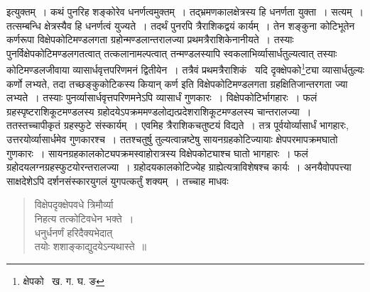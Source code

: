 \documentclass[11pt, openany]{book}
\begin{document}
\noindent इत्युक्तम्~। कथं पुनरिह शङ्कोरेव धनर्णत्वमुक्तम्~। तद्भ्रमणकालक्षेत्रस्य हि धनर्णता युक्ता~। सत्यम्~। तत्सम्बन्धि क्षेत्रस्यैव हि धनर्णत्वं युज्यते~। तदर्थं पुनरपि त्रैराशिकद्वयं कार्यम्~। तेन शङ्कुना कोटिभूतेन कर्णरूपा विक्षेपकोटिमण्डलगता ग्रहोन्मण्डलान्तरालज्या प्रथमत्रैराशिकेनानीयते~। तस्याः पुनर्विक्षेपकोटिमण्डलगतत्वात् तत्कलानामल्पत्वात् तन्मण्डलस्यापि स्वकलाभिर्व्यासार्धतुल्यत्वात् तस्याः कोटिमण्डलजीवाया व्यासार्धवृत्तपरिणमनं द्वितीयेन~। तत्रैवं प्रथमत्रैराशिकं \textendash\ यदि दृक्क्षेपको\renewcommand{\thefootnote}{१}\footnote{क्षेपको \textendash\ ख. ग. घ. ङ}ट्या व्यासार्धतुल्यः कर्णो लभ्यते, तदा तच्छङ्कुकोटिकस्य कियान् कर्ण इति विक्षेपकोटिमण्डलगता ग्रहक्षितिजान्तरगता ज्या लभ्यते~। तस्याः पुनर्व्यासार्धवृत्तपरिणमनेऽपि व्यासार्धं गुणकारः~। विक्षेपकोटिर्भागहारः~। फलं ग्रहस्पृष्टराशिकूटमण्डलस्य ग्रहोदयेऽपक्रममण्डलोद्यत्प्रदेशराशिकूटमण्डलस्य चान्तरालज्या~। ततस्तच्चापीकृतं ग्रहस्फुटे संस्कार्यम्~। एवमिह त्रैराशिकचतुष्टयं विद्यते~। तत्र पूर्वयोर्व्यासार्धं भागहारः, उत्तरयोर्व्यासार्धमेव गुणकारश्च~। ततश्चतुर्षु तुल्यत्वान्नष्टेषु सायनग्रहकोटिज्यायाः क्षेपपरमापक्रमघातो गुणकारः~। सायनग्रहकालकोट्यपक्रमस्वाहोरात्रस्य विक्षेपकोट्याश्च घातो भागहारः~। फलं ग्रहोदयलग्नग्रहस्फुटयोरन्तरालज्या~। ग्रहोदयकालकोटिज्येह ग्राह्येत्यत्राविशेषश्च कार्यः~। अनयैवोपपत्त्या साक्षदेशेऽपि दर्शनसंस्कारयुगलं युगपत्कर्तुं शक्यम्~। तच्चाह माधवः\textendash 

\begin{quote}
{\qt विक्षेपदृक्क्षेपवधे त्रिमौर्व्या\\
 निहत्य तत्कोटिवधेन भक्ते~।\\
धनुर्धनर्णं हरिदैक्यभेदात्\\
तयोः शशाङ्काद्युदयेऽन्यथास्ते~॥}
\end{quote}

\newpage
\end{document}

